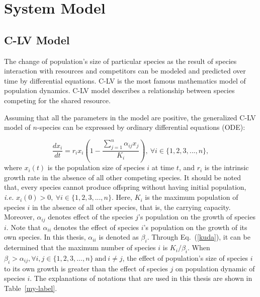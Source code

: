 \chapter{System Model}
\section{C-LV Model}

The change of population's size of particular species as the result of species interaction with resources and competitors can be modeled and predicted over time by differential equations. C-LV is the most famous mathematics model of population dynamics. C-LV model describes a relationship between species competing for the shared resource.



Assuming that all the parameters in the model are positive, the generalized C-LV model of $n$-species can be expressed by ordinary differential equations (ODE):

\begin{equation}
\label{kuda}
\frac{dx_i}{dt}=r_ix_i(1-\frac{\sum_{j=1}^{n} \alpha_{ij}x_j}{K_i}),~\forall i \in \{1,2,3,...,n\},
\end{equation}
where $x_i(t)$ is  the population size of species $i$ at time $t$, and $r_i$ is the intrinsic growth rate in the absence of all other competing species. It should be noted that, every species cannot produce offspring without having initial population, \textit{i.e.} $x_i(0)>0,~\forall i \in \{1,2,3,...,n\}.$
Here, $K_i$ is the maximum population of species $i$ in the absence of all other species, that is, the carrying capacity. Moreover, $\alpha_{ij}$ denotes effect of the species $j$'s population on the growth of species $i$. Note that $\alpha_{ii}$ denotes the effect of species $i$'s population on the growth of its own species. In this thesis, $\alpha_{ii}$ is denoted as $\beta_i$. 
Through Eq.~(\ref{kuda}), it can be determined that the maximum number of species $i$ is $K_i/\beta_i$.    
When $\beta_i > \alpha_{ij}, \forall i,j \in \{1,2,3,...,n\}~\text{and}~i \neq j $, the effect of population's size of species $i$ to its own growth is greater than the effect of species $j$ on population dynamic of species $i$. The explanations of notations that are used in this thesis are shown in Table~\ref{my-label}.

